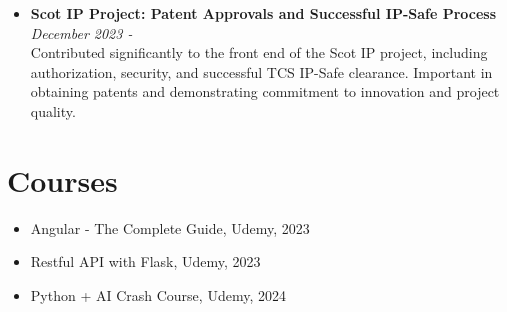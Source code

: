 \documentclass[letterpaper,10pt]{article}
\begin{document}
\begin{multicols}{2}
\begin{itemize}
    \item \textbf{Scot IP Project: Patent Approvals and Successful IP-Safe Process} \\
    \textit{December 2023 -} \\
    Contributed significantly to the front end of the Scot IP project, including authorization, security, and successful TCS IP-Safe clearance. Important in obtaining patents and demonstrating commitment to innovation and project quality.
\end{itemize}

\section*{\textcolor{headercolor}{Courses}}
\begin{itemize}
    \item Angular - The Complete Guide, Udemy, 2023
    \item Restful API with Flask, Udemy, 2023
    \item Python + AI Crash Course, Udemy, 2024
\end{itemize}

\end{multicols}
\end{document}
